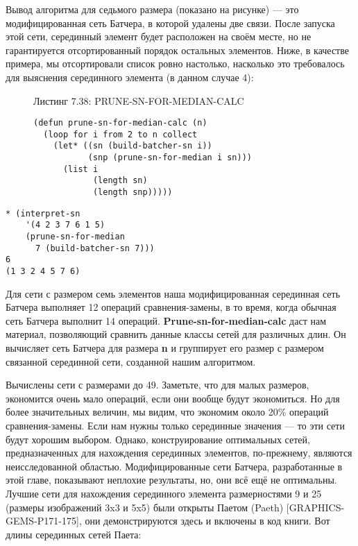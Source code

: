 Вывод алгоритма для седьмого размера (показано на рисунке) --- это модифицированная сеть Батчера, в которой удалены две связи. После запуска этой сети, серединный элемент будет расположен на своём месте, но не гарантируется отсортированный порядок остальных элементов. Ниже, в качестве примера, мы отсортировали список ровно настолько, насколько это требовалось для выяснения серединного элемента (в данном случае 4):

\begin{figure}Листинг 7.38: PRUNE-SN-FOR-MEDIAN-CALC\label{listing_7.38}
\listbegin
\begin{verbatim}
(defun prune-sn-for-median-calc (n)
  (loop for i from 2 to n collect
    (let* ((sn (build-batcher-sn i))
           (snp (prune-sn-for-median i sn)))
      (list i
            (length sn)
            (length snp)))))
\end{verbatim}
\listend
\end{figure}

\begin{verbatim}
* (interpret-sn
    '(4 2 3 7 6 1 5)
    (prune-sn-for-median
      7 (build-batcher-sn 7)))
6
(1 3 2 4 5 7 6)
\end{verbatim}

Для сети с размером семь элементов наша модифицированная серединная сеть Батчера выполняет 12 операций сравнения-замены, в то время, когда обычная сеть Батчера выполнит 14 операций. \textbf{Prune-sn-for-median-calc} даст нам материал, позволяющий сравнить данные классы сетей для различных длин. Он вычисляет сеть Батчера для размера \textbf{n} и группирует его размер с размером связанной серединной сети, созданной нашим алгоритмом.

Вычислены сети с размерами до 49. Заметьте, что для малых размеров, экономится очень мало операций, если они вообще будут экономиться. Но для более значительных величин, мы видим, что экономим около 20\% операций сравнения-замены. Если нам нужны только серединные значения --- то эти сети будут хорошим выбором. Однако, конструирование оптимальных сетей, предназначенных для нахождения серединных элементов, по-прежнему, являются неисследованной областью. Модифицированные сети Батчера, разработанные в этой главе, показывают неплохие результаты, но, они всё ещё не оптимальны. Лучшие сети для нахождения серединного элемента размерностями 9 и 25 (размеры изображений 3x3 и 5x5) были открыты Паетом (Paeth) [GRAPHICS-GEMS-P171-175], они демонстрируются здесь и включены в код книги. Вот длины серединных сетей Паета:

